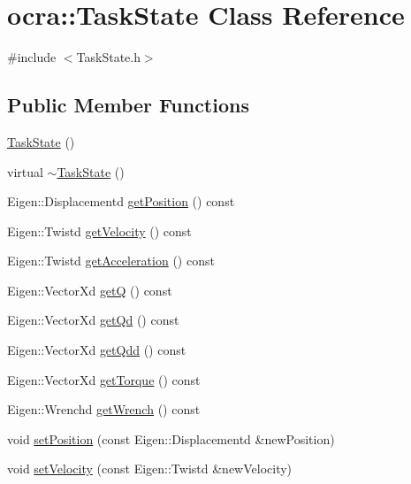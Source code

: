 \hypertarget{classocra_1_1TaskState}{}\section{ocra\+:\+:Task\+State Class Reference}
\label{classocra_1_1TaskState}


{\ttfamily \#include $<$Task\+State.\+h$>$}

\subsection*{Public Member Functions}
\begin{DoxyCompactItemize}
\item 
\hyperlink{classocra_1_1TaskState_ac1f837e41fe77702983ca2931eb7335f}{Task\+State} ()
\item 
virtual \hyperlink{classocra_1_1TaskState_af41cac3e2be634b88815fde36a75434f}{$\sim$\+Task\+State} ()
\item 
Eigen\+::\+Displacementd \hyperlink{classocra_1_1TaskState_ae7dd2f005a9aab81fa38e3dcad16af15}{get\+Position} () const
\item 
Eigen\+::\+Twistd \hyperlink{classocra_1_1TaskState_afe6820421d754df7b005e6ebc4e10919}{get\+Velocity} () const
\item 
Eigen\+::\+Twistd \hyperlink{classocra_1_1TaskState_a807bf13b983e7656b89f559a16d61b26}{get\+Acceleration} () const
\item 
Eigen\+::\+Vector\+Xd \hyperlink{classocra_1_1TaskState_ab878584c1e0f3fe512006f7ade4d03fe}{getQ} () const
\item 
Eigen\+::\+Vector\+Xd \hyperlink{classocra_1_1TaskState_a18507d702b5442c2de22b48db795e46d}{get\+Qd} () const
\item 
Eigen\+::\+Vector\+Xd \hyperlink{classocra_1_1TaskState_ae44110907bda20468f2d1b5416ce347f}{get\+Qdd} () const
\item 
Eigen\+::\+Vector\+Xd \hyperlink{classocra_1_1TaskState_a822fa2017408d2cd8ddbeb9ba2546e1e}{get\+Torque} () const
\item 
Eigen\+::\+Wrenchd \hyperlink{classocra_1_1TaskState_a4c825e39ca7b75dc4fcaf8015783983d}{get\+Wrench} () const
\item 
void \hyperlink{classocra_1_1TaskState_a4107e9ca574e2baa40add4d993d3c01f}{set\+Position} (const Eigen\+::\+Displacementd \&new\+Position)
\item 
void \hyperlink{classocra_1_1TaskState_ab689ec0b7ba14557f5f475f1feba22b0}{set\+Velocity} (const Eigen\+::\+Twistd \&new\+Velocity)

\end{DoxyCompactItemize}
